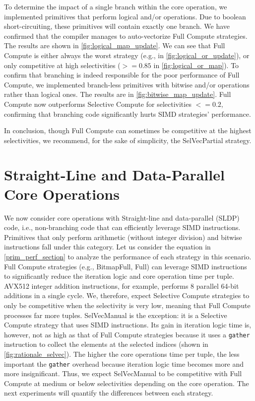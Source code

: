 \documentclass[12pt]{cmuthesis}
\begin{document}
To determine the impact of a single branch within the core operation, we implemented primitives that perform logical and/or operations. Due to boolean short-circuiting, these primitives will contain exactly one branch. We have confirmed that the compiler manages to auto-vectorize Full Compute strategies. The results are shown in \cref{fig:logical_map_update}. We can see that Full Compute is either always the worst strategy (e.g., in \cref{fig:logical_or_update}), or only competitive at high selectivities ($>= 0.85$ in \cref{fig:logical_or_map}). To confirm that branching is indeed responsible for the poor performance of Full Compute, we implemented branch-less primitives with bitwise and/or operations rather than logical ones. The results are in \cref{fig:bitwise_map_update}. Full Compute now outperforms Selective Compute for selectivities $<= 0.2$, confirming that branching code significantly hurts SIMD strategies' performance.

In conclusion, though Full Compute can sometimes be competitive at the highest selectivities, we recommend, for the sake of simplicity, the SelVecPartial strategy.

\section{Straight-Line and Data-Parallel Core Operations}
\label{sldpsection}

We now consider core operations with Straight-line and data-parallel (SLDP) code, i.e., non-branching code that can efficiently leverage SIMD instructions. Primitives that only perform arithmetic (without integer division) and bitwise instructions fall under this category. Let us consider the equation in \cref{prim_perf_section} to analyze the performance of each strategy in this scenario. Full Compute strategies (e.g., BitmapFull, Full) can leverage SIMD instructions to significantly reduce the iteration logic and core operation time per tuple. AVX512 \cite{intel2019} integer addition instructions, for example, performs 8 parallel 64-bit additions in a single cycle. We, therefore, expect Selective Compute strategies to only be competitive when the selectivity is very low, meaning that Full Compute processes far more tuples. SelVecManual is the exception: it is a Selective Compute strategy that uses SIMD instructions. Its gain in iteration logic time is, however, not as high as that of Full Compute strategies because it uses a \texttt{gather} instruction \cite{intel2019} to collect the elements at the selected indices (shown in \cref{fig:rationale_selvec}). The higher the core operations time per tuple, the less important the \texttt{gather} overhead because iteration logic time becomes more and more insignificant. Thus, we expect SelVecManual to be competitive with Full Compute at medium or below selectivities depending on the core operation. The next experiments will quantify the differences between each strategy.
\end{document}

